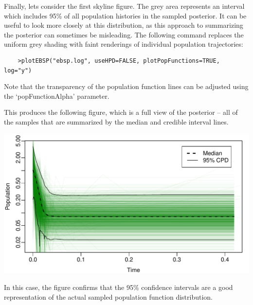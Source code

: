 \documentclass[a4paper,11pt]{article}
\begin{document}
Finally, lets consider the first skyline figure. The grey area represents an
interval which includes 95\% of all population histories in the sampled
posterior.  It can be useful to look more closely at this distribution, as this
approach to summarizing the posterior can sometimes be misleading.  The
following command replaces the uniform grey shading with faint renderings of
individual population trajectories:

\begin{verbatim}
    >plotEBSP("ebsp.log", useHPD=FALSE, plotPopFunctions=TRUE, log="y")
\end{verbatim}

Note that the transparency of the population function lines can be adjusted
using the `popFunctionAlpha' parameter.

This produces the following figure, which is a full view of the posterior --
all of the samples that are summarized by the median and credible interval
lines.

\includegraphics[width=\textwidth]{figures/mystery3.pdf}

In this case, the figure confirms that the 95\% confidence intervals are a good
representation of the actual sampled population function distribution.



\end{document}
